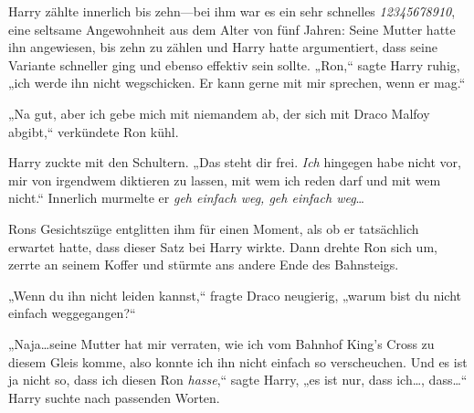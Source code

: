 Harry zählte innerlich bis zehn—bei ihm war es ein sehr schnelles \emph{12345678910}, eine seltsame Angewohnheit aus dem Alter von fünf Jahren: Seine Mutter hatte ihn angewiesen, bis zehn zu zählen und Harry hatte argumentiert, dass seine Variante schneller ging und ebenso effektiv sein sollte. „Ron,“ sagte Harry ruhig, „ich werde ihn nicht wegschicken. Er kann gerne mit mir sprechen, wenn er mag.“

„Na gut, aber ich gebe mich mit niemandem ab, der sich mit Draco Malfoy abgibt,“ verkündete Ron kühl.

Harry zuckte mit den Schultern. „Das steht dir frei. \emph{Ich} hingegen habe nicht vor, mir von irgendwem diktieren zu lassen, mit wem ich reden darf und mit wem nicht.“ Innerlich murmelte er \emph{geh einfach weg, geh einfach weg}…

Rons Gesichtszüge entglitten ihm für einen Moment, als ob er tatsächlich erwartet hatte, dass dieser Satz bei Harry wirkte. Dann drehte Ron sich um, zerrte an seinem Koffer und stürmte ans andere Ende des Bahnsteigs.

„Wenn du ihn nicht leiden kannst,“ fragte Draco neugierig, „warum bist du nicht einfach weggegangen?“

„Naja…seine Mutter hat mir verraten, wie ich vom Bahnhof King's Cross zu diesem Gleis komme, also konnte ich ihn nicht einfach so verscheuchen. Und es ist ja nicht so, dass ich diesen Ron \emph{hasse},“ sagte Harry, „es ist nur, dass ich…, dass…“ Harry suchte nach passenden Worten.

